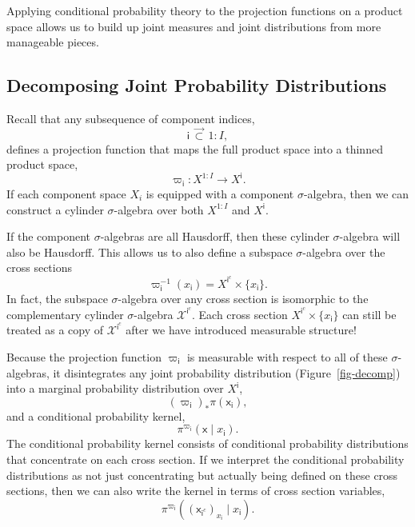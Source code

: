 \documentclass[
  letterpaper,
  DIV=11,
  numbers=noendperiod]{scrartcl}
\begin{document}
Applying conditional probability theory to the projection functions on a
product space allows us to build up joint measures and joint
distributions from more manageable pieces.

\subsection{Decomposing Joint Probability
Distributions}\label{decomposing-joint-probability-distributions}

Recall that any subsequence of component indices, \[
\mathsf{i} \, \vec{\subset} \, 1:I,
\] defines a projection function that maps the full product space into a
thinned product space, \[
\varpi_{\mathsf{i}} : X^{1:I} \rightarrow X^{\mathsf{i}}.
\] If each component space \(X_{i}\) is equipped with a component
\(\sigma\)-algebra, then we can construct a cylinder \(\sigma\)-algebra
over both \(X^{1:I}\) and \(X^{\mathsf{i}}\).

If the component \(\sigma\)-algebras are all Hausdorff, then these
cylinder \(\sigma\)-algebra will also be Hausdorff. This allows us to
also define a subspace \(\sigma\)-algebra over the cross sections \[
\varpi_{\mathsf{i}}^{-1}( x_{\mathsf{i}} )
=
X^{\mathsf{i}^{c}} \times \{ x_{\mathsf{i}} \}.
\] In fact, the subspace \(\sigma\)-algebra over any cross section is
isomorphic to the complementary cylinder \(\sigma\)-algebra
\(\mathcal{X}^{\mathsf{i}^{c}}\). Each cross section
\(X^{\mathsf{i}^{c}} \times \{ x_{\mathsf{i}} \}\) can still be treated
as a copy of \(\mathcal{X}^{\mathsf{i}^{c}}\) after we have introduced
measurable structure!

Because the projection function \(\varpi_{\mathsf{i}}\) is measurable
with respect to all of these \(\sigma\)-algebras, it disintegrates any
joint probability distribution (Figure~\ref{fig-decomp}) into a marginal
probability distribution over \(X^{\mathsf{i}}\), \[
( \varpi_{ \mathsf{i} } )_{*} \pi ( \mathsf{x}_{\mathsf{i}} ),
\] and a conditional probability kernel, \[
\pi^{ \varpi_{\mathsf{i}} }(
  \mathsf{x} \mid x_{ \mathsf{i} }
).
\] The conditional probability kernel consists of conditional
probability distributions that concentrate on each cross section. If we
interpret the conditional probability distributions as not just
concentrating but actually being defined on these cross sections, then
we can also write the kernel in terms of cross section variables, \[
\pi^{ \varpi_{\mathsf{i}} }(
  (\mathsf{x}_{\mathsf{i}^{c}} )_{x_{\mathsf{i}}} \mid
  x_{ \mathsf{i} }
).
\]
\end{document}
